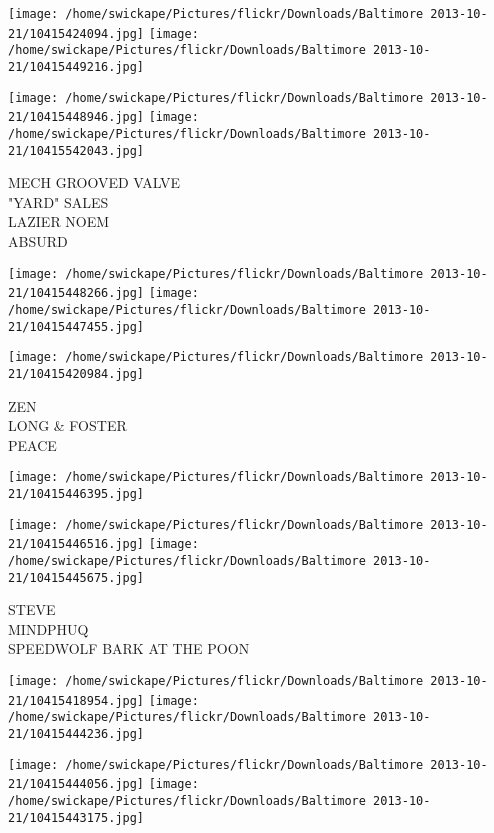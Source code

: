 \documentclass[10pt,letterpaper]{article}
\begin{document}
\texttt{[image: /home/swickape/Pictures/flickr/Downloads/Baltimore 2013-10-21/10415424094.jpg]}
\texttt{[image: /home/swickape/Pictures/flickr/Downloads/Baltimore 2013-10-21/10415449216.jpg]}

\texttt{[image: /home/swickape/Pictures/flickr/Downloads/Baltimore 2013-10-21/10415448946.jpg]}
\texttt{[image: /home/swickape/Pictures/flickr/Downloads/Baltimore 2013-10-21/10415542043.jpg]}

MECH GROOVED VALVE\\
"YARD" SALES\\
LAZIER NOEM\\
ABSURD\\
\pagebreak

\texttt{[image: /home/swickape/Pictures/flickr/Downloads/Baltimore 2013-10-21/10415448266.jpg]}
\texttt{[image: /home/swickape/Pictures/flickr/Downloads/Baltimore 2013-10-21/10415447455.jpg]}

\texttt{[image: /home/swickape/Pictures/flickr/Downloads/Baltimore 2013-10-21/10415420984.jpg]}

ZEN\\
LONG \& FOSTER\\
PEACE\\
\pagebreak

\texttt{[image: /home/swickape/Pictures/flickr/Downloads/Baltimore 2013-10-21/10415446395.jpg]}

\vspace{0.25in}
\texttt{[image: /home/swickape/Pictures/flickr/Downloads/Baltimore 2013-10-21/10415446516.jpg]}
\texttt{[image: /home/swickape/Pictures/flickr/Downloads/Baltimore 2013-10-21/10415445675.jpg]}

STEVE\\
MINDPHUQ\\
SPEEDWOLF BARK AT THE POON\\
\pagebreak

\texttt{[image: /home/swickape/Pictures/flickr/Downloads/Baltimore 2013-10-21/10415418954.jpg]}
\texttt{[image: /home/swickape/Pictures/flickr/Downloads/Baltimore 2013-10-21/10415444236.jpg]}

\texttt{[image: /home/swickape/Pictures/flickr/Downloads/Baltimore 2013-10-21/10415444056.jpg]}
\texttt{[image: /home/swickape/Pictures/flickr/Downloads/Baltimore 2013-10-21/10415443175.jpg]}
\end{document}
